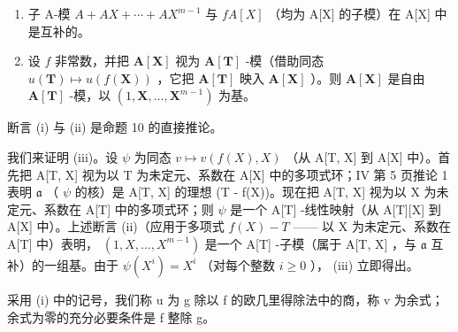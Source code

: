 \begin{enumerate}
\def\labelenumi{(\roman{enumi})}
\setcounter{enumi}{1}
\item
  子 A-模 \(A + AX + \cdots + AX^{m-1}\) 与 \(fA[X]\) （均为 A{[}X{]} 的子模）在 A{[}X{]} 中是互补的。
\item
  设 \(f\) 非常数，并把 \(\mathbf{A}[\mathbf{X}]\) 视为 \(\mathbf{A}[\mathbf{T}]\) -模（借助同态 \(u(\mathbf{T}) \mapsto u(f(\mathbf{X}))\) ，它把 \(\mathbf{A}[\mathbf{T}]\) 映入 \(\mathbf{A}[\mathbf{X}]\) ）。则 \(\mathbf{A}[\mathbf{X}]\) 是自由 \(\mathbf{A}[\mathbf{T}]\) -模，以 \((1, \mathbf{X}, \ldots, \mathbf{X}^{m-1})\) 为基。
\end{enumerate}

断言 (i) 与 (ii) 是命题 10 的直接推论。

我们来证明 (iii)。设 \(\psi\) 为同态 \(v \mapsto v(f(X), X)\) （从 A{[}T, X{]} 到 A{[}X{]} 中）。首先把 A{[}T, X{]} 视为以 T 为未定元、系数在 A{[}X{]} 中的多项式环；IV 第 5 页推论 1 表明 \(\mathfrak{a}\) （ \(\psi\) 的核）是 A{[}T, X{]} 的理想 (T - f(X))。现在把 A{[}T, X{]} 视为以 X 为未定元、系数在 A{[}T{]} 中的多项式环；则 \(\psi\) 是一个 A{[}T{]} -线性映射（从 A{[}T{]}{[}X{]} 到 A{[}X{]} 中）。上述断言 (ii)（应用于多项式 \(f(X) - T\) —— 以 X 为未定元、系数在 A{[}T{]} 中）表明， \((1, X, ..., X^{m-1})\) 是一个 A{[}T{]} -子模（属于 A{[}T, X{]} ，与 \(\mathfrak{a}\) 互补）的一组基。由于 \(\psi(X^i) = X^i\) （对每个整数 \(i \geqslant 0\) ）， (iii) 立即得出。

采用 (i) 中的记号，我们称 u 为 g 除以 f 的欧几里得除法中的商，称 v 为余式；余式为零的充分必要条件是 f 整除 g。

